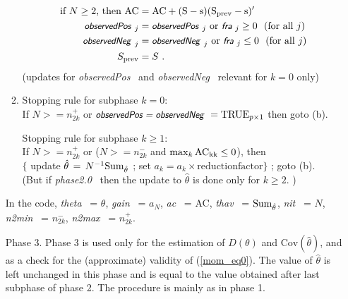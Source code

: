 \documentclass[a4paper,12pt,fleqn]{article}
\newcommand{\Cov}{\mbox{Cov}}
\newcommand{\nnm}[1]{\textsf{\small\textit{#1}\ }}
\begin{document}
\begin{enumerate}
\begin{enumerate}
\begin{align*}
            \text{if $N \geq 2$, then }
            \rm{AC} & =  \rm{AC} + (S - s)(S_{\rm{prev}} - s)' \\
            \nnm{observedPos}_j &=
                \nnm{observedPos}_j \text{ or } \nnm{fra}_j \geq 0 \
                    \text{ (for all } j)\\
            \nnm{observedNeg}_j &=
                \nnm{observedNeg}_j \text{ or } \nnm{fra}_j \leq 0 \
                    \text{ (for all } j)\\
            S_{\rm{prev}} &= S \ .
            \end{align*}
            (updates for \nnm{observedPos} and \nnm{observedNeg}
            relevant for $k=0$ only)
     \item  Stopping rule for subphase $k=0$:\\
            If $N >= n_{2k}^+$ or
            $\nnm{observedPos = observedNeg}  = \text{TRUE}_{p \times 1}$
            then goto (b).
            \medskip

            Stopping rule for subphase $k \geq 1$:\\
            If $N >= n_{2k}^+$ or
            ($N >= n_{2k}^-$ and $\max_k \rm{AC}_{kk} \leq 0$), then\\
            $\big\{$ update $\hat\theta \,=\, N^{-1} {\rm{Sum}}_{\hat\theta}$ ;
                   set $a_k = a_k \times \text{reductionfactor} \big\}$ ;
            goto (b).\\
            (But if \nnm{phase2.0} then the update to $\hat\theta$ is done
            only for $k \geq 2$.  )
     \end{enumerate}
     In the code, \nnm{theta} = $\theta$, \nnm{gain} = $a_N$, \nnm{ac} = AC,
     \nnm{thav} = ${\rm{Sum}}_{\hat\theta}$, \nnm{nit} = $N$,\\
     \nnm{n2min} = $n_{2k}^-$, \nnm{n2max} = $n_{2k}^+$.
\item[Phase 3.]
      Phase 3 is used only for the estimation of $D(\theta)$ and
      $\Cov(\hat\theta)$,
      and as a check for the (approximate) validity of (\ref{mom_eq0}).
      The value of $\hat{\theta}$ is left unchanged in this phase
      and is equal to the value obtained after last subphase of phase 2.
      The procedure is mainly as in phase 1.


\end{enumerate}
\end{document}
